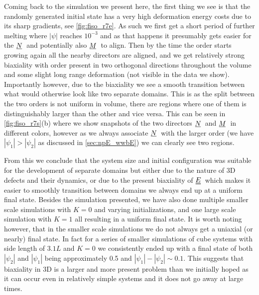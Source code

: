 \documentclass[12pt]{article}
\newcommand{\suf}[2]{\stackunder[0.5pt]{\stackunder[1pt]{\ensuremath{#1}}{\rule{\widthof{\ensuremath{#2}}*\real{0.9}}{.1ex}}}{}}
\newcommand{\duf}[2]{\stackunder[0.5pt]{\stackunder[0.8pt]{\stackunder[1pt]{\ensuremath{#1}}{\rule{\widthof{\ensuremath{#2}}*\real{0.9}}{.1ex}}}{\rule{\widthof{\ensuremath{#2}}*\real{0.9}}{.1ex}}}{}}
\newcommand{\su}[1]{\suf{#1}{#1}}
\newcommand{\du}[1]{\duf{#1}{#1}}
\newcommand{\NN}{\ensuremath{\su{N}}}
\newcommand{\MM}{\ensuremath{\su{M}}}
\newcommand{\EE}{\ensuremath{\du{E}}}
\begin{document}
        Coming back to the simulation we present here, the first thing we see is that the randomly generated initial state has a very high deformation energy costs due to its sharp gradients, see \cref{fig:fiso_r7e}.
        As such we first get a short period of further melting where $|\psi|$ reaches $10^{-3}$ and as that happens it presumably gets easier for the \NN\ and potentially also \MM\ to align.
        Then by the time the order starts growing again all the nearby directors are aligned, and we get relatively strong biaxiality with order present in two orthogonal directions throughout the volume and some slight long range deformation (not visible in the data we show).
        Importantly however, due to the biaxiality we see a smooth transition between what would otherwise look like two separate domains.
        This is as the split between the two orders is not uniform in volume, there are regions where one of them is distinguishably larger than the other and vice versa.
        This can be seen in \cref{fig:fiso_r7s}(b) where we show snapshots of the two directors \NN\ and \MM\ in different colors, however as we always associate \NN\ with the larger order (we have $|\psi_1| > |\psi_2|$ as discussed in \cref{sec:npE_wwbE}) we can clearly see two regions.

        From this we conclude that the system size and initial configuration was suitable for the development of separate domains but either due to the nature of 3D defects and their dynamics, or due to the present biaxiality of \EE\ which makes it easier to smoothly transition between domains we always end up at a uniform final state.
        Besides the simulation presented, we have also done multiple smaller scale simulations with $K=0$ and varying initializations, and one large scale simulation with $K=1$ all resulting in a uniform final state.
        It is worth noting however, that in the smaller scale simulations we do not always get a uniaxial (or nearly) final state.
        In fact for a series of smaller simulations of cube systems with side length of $3.1\si{L}$ and $K=0$ we consistently ended up with a final state of both $|\psi_2|$ and $|\psi_1|$ being approximately 0.5 and $|\psi_1|-|\psi_2|\sim0.1$.
        This suggests that biaxiality in 3D is a larger and more present problem than we initially hoped as it can occur even in relatively simple systems and it does not go away at large times.
\end{document}

